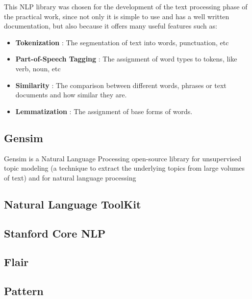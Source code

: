         \par This NLP library was chosen for the development of the text processing phase of the practical work, since not only it is simple to use and has a well written documentation, but also because it offers many useful features such as:

        \begin{itemize}
            \item \textbf{Tokenization} : The segmentation of text into words, punctuation, etc
            \item \textbf{Part-of-Speech Tagging} : The assignment of word types to tokens, like verb, noun, etc
            \item \textbf{Similarity} : The comparison between different words, phrases or text documents and how similar they are.
            \item \textbf{Lemmatization} : The assignment of base forms of words.
        \end{itemize}

        \subsection{Gensim}

        \par Gensim is a Natural Language Processing open-source library for unsupervised topic modeling (a technique to extract the underlying topics from large volumes of text)  and for natural language processing


        \subsection{Natural Language ToolKit}

        \subsection{Stanford Core NLP}

        \subsection{Flair}

        \subsection{Pattern}